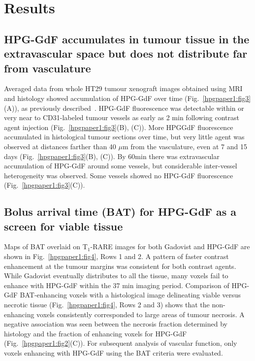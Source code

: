 \section{Results}

\subsection{HPG-GdF accumulates in tumour tissue in the extravascular space but does not distribute far from vasculature}

Averaged data from whole HT29 tumour xenograft images obtained using MRI and histology showed accumulation of \ac{HPG-GdF} over time (Fig.~\ref{hpgpaper1:fig3}(A)), as previously described~\cite{Saatchi:2012hc}.
HPG-GdF fluorescence was detectable within or very near to CD31-labeled tumour vessels as early as 2 min following contrast agent injection (Fig.~\ref{hpgpaper1:fig3}(B), (C)).
More HPGGdF fluorescence accumulated in histological tumour sections over time, but very little agent was observed at distances farther than 40 $\mu$m from the vasculature, even at 7 and 15 days (Fig.~\ref{hpgpaper1:fig3}(B), (C)).
By 60min there was extravascular accumulation of \ac{HPG-GdF} around some vessels, but considerable inter-vessel heterogeneity was observed.
Some vessels showed no \ac{HPG-GdF} fluorescence (Fig.~\ref{hpgpaper1:fig3}(C)).

\subsection{Bolus arrival time (BAT) for \ac{HPG-GdF} as a screen for viable tissue}

Maps of BAT overlaid on T$_1$-RARE images for both Gadovist and \ac{HPG-GdF} are shown in Fig.~\ref{hpgpaper1:fig4}, Rows 1 and 2.
A pattern of faster contrast enhancement at the tumour margins was consistent for both contrast agents.
While Gadovist eventually distributes to all the tissue, many voxels fail to enhance with \ac{HPG-GdF} within the 37 min imaging period.
Comparison of \ac{HPG-GdF} BAT-enhancing voxels with a histological image delineating viable versus necrotic tissue (Fig.~\ref{hpgpaper1:fig4}, Rows 2 and 3) shows that the non-enhancing voxels consistently corresponded to large areas of tumour necrosis.
A negative association was seen between the necrosis fraction determined by histology and the fraction of enhancing voxels for \ac{HPG-GdF} (Fig.~\ref{hpgpaper1:fig2}(C)).
For subsequent analysis of vascular function, only voxels enhancing with \ac{HPG-GdF} using the BAT criteria were evaluated.

